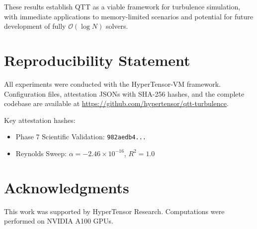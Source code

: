 \documentclass[11pt,a4paper]{article}
\newcommand{\bigO}{\mathcal{O}}
\theoremstyle{definition}
\begin{document}
These results establish QTT as a viable framework for turbulence simulation, with immediate applications to memory-limited scenarios and potential for future development of fully $\bigO(\log N)$ solvers.

\section*{Reproducibility Statement}

All experiments were conducted with the HyperTensor-VM framework.
Configuration files, attestation JSONs with SHA-256 hashes, and the complete codebase are available at \url{https://github.com/hypertensor/qtt-turbulence}.

Key attestation hashes:
\begin{itemize}
    \item Phase 7 Scientific Validation: \texttt{982aedb4...}
    \item Reynolds Sweep: $\alpha = -2.46 \times 10^{-16}$, $R^2 = 1.0$
\end{itemize}

\section*{Acknowledgments}

This work was supported by HyperTensor Research.
Computations were performed on NVIDIA A100 GPUs.
\end{document}
